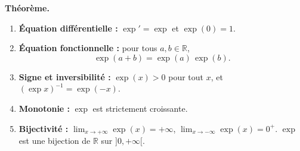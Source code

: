 \begin{tcolorbox}[thmbox]
  \textbf{Théorème.}\enspace%
  \begin{enumerate}
    \item \textbf{Équation différentielle :} $\exp' = \exp$ et $\exp(0) = 1$.
    \item \textbf{Équation fonctionnelle :} pour tous $a, b \in \mathbb{R}$,
    \[
      \exp(a+b) = \exp(a)\,\exp(b).
    \]
    \item \textbf{Signe et inversibilité :} $\exp(x) > 0$ pour tout $x$,
          et $(\exp x)^{-1} = \exp(-x)$.
    \item \textbf{Monotonie :} $\exp$ est strictement croissante.
    \item \textbf{Bijectivité :}
          $\displaystyle\lim_{x\to +\infty}\exp(x)=+\infty$,\quad
          $\displaystyle\lim_{x\to -\infty}\exp(x)=0^+$.\quad
          $\exp$ est une bijection de $\mathbb{R}$ sur $]0,+\infty[$.
  \end{enumerate}
\end{tcolorbox}

